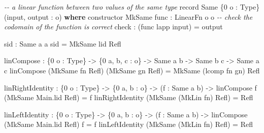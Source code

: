 \documentclass[
]{article}
\newenvironment{Shaded}{}{}
\newcommand{\CommentTok}[1]{\textcolor[rgb]{0.38,0.63,0.69}{\textit{#1}}}
\newcommand{\DataTypeTok}[1]{\textcolor[rgb]{0.56,0.13,0.00}{#1}}
\newcommand{\DecValTok}[1]{\textcolor[rgb]{0.25,0.63,0.44}{#1}}
\newcommand{\KeywordTok}[1]{\textcolor[rgb]{0.00,0.44,0.13}{\textbf{#1}}}
\newcommand{\NormalTok}[1]{#1}
\newcommand{\OperatorTok}[1]{\textcolor[rgb]{0.40,0.40,0.40}{#1}}
\newcommand{\OtherTok}[1]{\textcolor[rgb]{0.00,0.44,0.13}{#1}}
\begin{document}
\begin{Shaded}
\begin{Highlighting}[]
\CommentTok{{-}{-} a linear function between two values of the same type}
\NormalTok{record }\DataTypeTok{Same}\NormalTok{ \{}\DecValTok{0}\NormalTok{ o }\OperatorTok{:} \DataTypeTok{Type}\NormalTok{\} (input, output }\OperatorTok{:}\NormalTok{ o) }\KeywordTok{where}
\NormalTok{  constructor }\DataTypeTok{MkSame}
\NormalTok{  func }\OperatorTok{:} \DataTypeTok{LinearFn}\NormalTok{ o o}
  \CommentTok{{-}{-} check the codomain of the function is correct}
\NormalTok{  check }\OperatorTok{:}\NormalTok{ (func }\OtherTok{\textasciigrave{}lapp\textasciigrave{}}\NormalTok{ input) }\OtherTok{=}\NormalTok{ output}

\NormalTok{sid }\OperatorTok{:} \DataTypeTok{Same}\NormalTok{ a a}
\NormalTok{sid }\OtherTok{=} \DataTypeTok{MkSame}\NormalTok{ lid }\DataTypeTok{Refl}

\NormalTok{linCompose }\OperatorTok{:}\NormalTok{ \{}\DecValTok{0}\NormalTok{ o }\OperatorTok{:} \DataTypeTok{Type}\NormalTok{\}}
  \OtherTok{{-}\textgreater{}}\NormalTok{ \{}\DecValTok{0}\NormalTok{ a, b, c }\OperatorTok{:}\NormalTok{ o\}}
  \OtherTok{{-}\textgreater{}} \DataTypeTok{Same}\NormalTok{ a b}
  \OtherTok{{-}\textgreater{}} \DataTypeTok{Same}\NormalTok{ b c}
  \OtherTok{{-}\textgreater{}} \DataTypeTok{Same}\NormalTok{ a c}
\NormalTok{linCompose (}\DataTypeTok{MkSame}\NormalTok{ fn }\DataTypeTok{Refl}\NormalTok{) (}\DataTypeTok{MkSame}\NormalTok{ gn }\DataTypeTok{Refl}\NormalTok{)}
  \OtherTok{=} \DataTypeTok{MkSame}\NormalTok{ (lcomp fn gn) }\DataTypeTok{Refl}

\NormalTok{linRightIdentity }\OperatorTok{:}\NormalTok{ \{}\DecValTok{0}\NormalTok{ o }\OperatorTok{:} \DataTypeTok{Type}\NormalTok{\}}
   \OtherTok{{-}\textgreater{}}\NormalTok{ \{}\DecValTok{0}\NormalTok{ a, b }\OperatorTok{:}\NormalTok{ o\}}
   \OtherTok{{-}\textgreater{}}\NormalTok{ (f }\OperatorTok{:} \DataTypeTok{Same}\NormalTok{ a b)}
   \OtherTok{{-}\textgreater{}}\NormalTok{ linCompose f (}\DataTypeTok{MkSame}\NormalTok{ Main.lid }\DataTypeTok{Refl}\NormalTok{) }\OtherTok{=}\NormalTok{ f}
\NormalTok{linRightIdentity (}\DataTypeTok{MkSame}\NormalTok{ (}\DataTypeTok{MkLin}\NormalTok{ fn) }\DataTypeTok{Refl}\NormalTok{) }\OtherTok{=} \DataTypeTok{Refl}

\NormalTok{linLeftIdentity }\OperatorTok{:}\NormalTok{ \{}\DecValTok{0}\NormalTok{ o }\OperatorTok{:} \DataTypeTok{Type}\NormalTok{\}}
   \OtherTok{{-}\textgreater{}}\NormalTok{ \{}\DecValTok{0}\NormalTok{ a, b }\OperatorTok{:}\NormalTok{ o\}}
   \OtherTok{{-}\textgreater{}}\NormalTok{ (f }\OperatorTok{:} \DataTypeTok{Same}\NormalTok{ a b)}
   \OtherTok{{-}\textgreater{}}\NormalTok{ linCompose (}\DataTypeTok{MkSame}\NormalTok{ Main.lid }\DataTypeTok{Refl}\NormalTok{) f }\OtherTok{=}\NormalTok{ f}
\NormalTok{linLeftIdentity (}\DataTypeTok{MkSame}\NormalTok{ (}\DataTypeTok{MkLin}\NormalTok{ fn) }\DataTypeTok{Refl}\NormalTok{) }\OtherTok{=} \DataTypeTok{Refl}


\end{Highlighting}
\end{Shaded}
\end{document}
